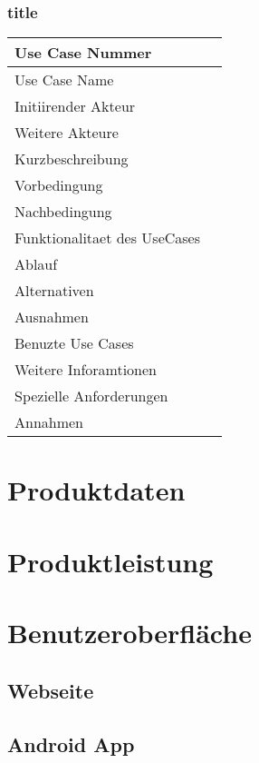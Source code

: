 \documentclass[10pt,a4paper]{article}
\begin{document}
	\subsubsection{title}
	\begin{tabular}{|p{5cm}|p{5cm}|}
	\hline Use Case Nummer &  \\ 
	\hline Use Case Name &  \\ 
	\hline Initiirender Akteur &  \\
	\hline Weitere Akteure &  \\
	\hline Kurzbeschreibung &  \\
	\hline Vorbedingung &  \\
	\hline Nachbedingung &  \\
	\hline Funktionalitaet des UseCases\\
	\hline Ablauf &  \\
	\hline Alternativen &  \\
	\hline Ausnahmen &  \\
	\hline Benuzte Use Cases &  \\
	\hline Weitere Inforamtionen \\
	\hline Spezielle Anforderungen &  \\
	\hline Annahmen &  \\
	\hline
	\end{tabular} 
\section{Produktdaten}
\section{Produktleistung}
\section{Benutzeroberfl\"ache}
\subsection{Webseite}
\subsection{Android App}
\end{document}
